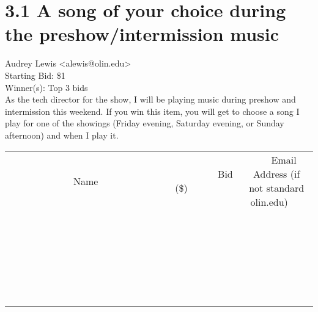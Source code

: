 \documentclass[11pt]{article}
\begin{document}
					\section*{3.1 A song of your choice during the preshow/intermission music}
					Audrey Lewis <alewis@olin.edu> \\
					Starting Bid: \$1 \\
					Winner(s): Top 3 bids \\
					As the tech director for the show, I will be playing music during preshow and intermission this weekend. If you win this item, you will get to choose a song I play for one of the showings (Friday evening, Saturday evening, or Sunday afternoon) and when I play it. \\
					[6ex]
					\begin{tabular}{c c c}
						~~~~~~~~~~~~~Name~~~~~~~~~~~~~ & ~~~~~~~~~Bid (\$)~~~~~~~~~ & ~~~Email Address (if not standard olin.edu)~~~ \\
				
 & & \\
\hline
 & & \\
\hline
 & & \\
\hline
 & & \\
\hline
 & & \\
\hline
 & & \\
\hline
 & & \\
\hline
 & & \\
\hline
 & & \\
\hline
 & & \\
\hline
 & & \\
\hline
 & & \\
\hline
 & & \\
\hline
 & & \\
\hline
 & & \\
\hline
 & & \\
\hline
 & & \\
\hline
 & & \\
\hline
 & & \\
\hline
 & & \\
\hline
 & & \\
\hline
 & & \\
\hline
 & & \\
\hline
 & & \\
\hline
 & & \\
\hline
 & & \\
\hline
					\end{tabular}
					\clearpage
				
\end{document}
